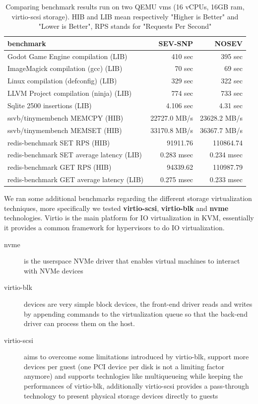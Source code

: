 \documentclass[twocolumn]{article}
\begin{document}
\begin{table}
    \centering
    \label{tab:tinyben-results}
    \begin{tabular}{l|r|r}
    \textbf{benchmark}                        & \textbf{SEV-SNP} & \textbf{NOSEV} \\
    \hline
    Godot Game Engine compilation (LIB)       &  410 sec         & 395 sec        \\
    ImageMagick compilation (gcc) (LIB)       &  70 sec          & 69 sec         \\
    Linux compilation (defconfig) (LIB)       &  329 sec         & 322 sec        \\
    LLVM Project compilation (ninja) (LIB)    &  774 sec         & 733 sec        \\
    Sqlite 2500 insertions (LIB)              &  4.106 sec       & 4.31 sec       \\
    ssvb/tinymembench MEMCPY (HIB)            &  22727.0 MB/s    & 23628.2 MB/s   \\
    ssvb/tinymembench MEMSET (HIB)            &  33170.8 MB/s    & 36367.7 MB/s   \\
    redis-benchmark SET RPS (HIB)             &  91911.76        & 110864.74      \\
    redis-benchmark SET average latency (LIB) &  0.283 msec      & 0.234 msec     \\
    redis-benchmark GET RPS (HIB)             &  94339.62        & 110987.79      \\
    redis-benchmark GET average latency (LIB) &  0.275 msec	     & 0.233 msec     \\
    \end{tabular}
    \caption{Comparing benchmark results run on two QEMU vms (16 vCPUs, 16GB ram, virtio-scsi storage). HIB and LIB mean respectively "Higher is Better" and "Lower is Better", RPS stands for "Requests Per Second"} 
\end{table}
We ran some additional benchmarks regarding the different storage virtualization techniques, more specifically we tested \textbf{virtio-scsi}, 
\textbf{virtio-blk} and \textbf{nvme} technologies. Virtio is the main platform for IO virtualization in KVM, essentially it provides a common framework for hypervisors to do IO virtualization.

\begin{description}
    \item[nvme] is the userspace NVMe driver that enables virtual machines to interact with NVMe devices
    \item[virtio-blk] devices are very simple block devices, the front-end driver reads and writes by appending commands to the virtualization queue so that the back-end driver can process them on the host.
    \item[virtio-scsi] aims to overcome some limitations introduced by virtio-blk, support more devices per guest (one PCI device per disk is not a limiting factor anymore) and supports technlogies like multiqueueing while keeping the performances of virtio-blk, additionally virtio-scsi provides a pass-through technology to present physical storage devices directly to guests
\end{description}
\end{document}

